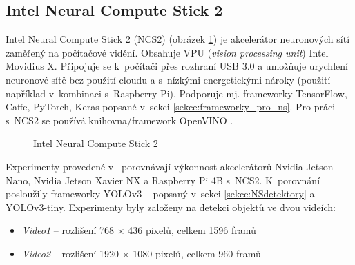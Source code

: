 \subsection*{Intel Neural Compute Stick 2}

Intel Neural Compute Stick 2 (NCS2) \cite{ncs2} (obrázek \ref{obrazek:ncs2}) je akcelerátor neuronových sítí zaměřený na počítačové vidění. Obsahuje VPU (\emph{vision processing unit}) Intel Movidius X. Připojuje se k~počítači přes rozhraní USB 3.0 a umožňuje urychlení neuronové sítě bez použití cloudu a s~nízkými energetickými nároky (použití například v~kombinaci s~Raspberry Pi). Podporuje mj. frameworky TensorFlow, Caffe, PyTorch, Keras popsané v~sekci \ref{sekce:frameworky_pro_ns}. Pro práci s~NCS2 se používá knihovna/framework OpenVINO \cite{openvino}. 

\begin{figure}[H]
  \begin{center}
  \label{obrazek:ncs2}
  \caption{Intel Neural Compute Stick 2 \cite{ncs2}}
  \end{center}
\end{figure}

Experimenty provedené v~\cite{ncs2testYolo} porovnávají výkonnost akcelerátorů Nvidia Jetson Nano, Nvidia Jetson Xavier NX a Raspberry Pi 4B s~NCS2. K~porovnání posloužily frameworky YOLOv3 -- popsaný v~sekci \ref{sekce:NSdetektory} a YOLOv3-tiny. Experimenty byly založeny na detekci objektů ve dvou videích:
\begin{itemize}
  \item \emph{Video1} -- rozlišení 768 $\times$ 436 pixelů, celkem 1596 framů
  \item \emph{Video2} -- rozlišení 1920 $\times$ 1080 pixelů, celkem 960 framů 
\end{itemize}

